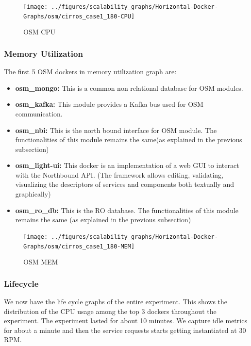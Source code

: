 \begin{figure}[h]
	\centering
	\texttt{[image: ../figures/scalability\_graphs/Horizontal-Docker-Graphs/osm/cirros\_case1\_180-CPU]}
	\caption{OSM CPU}
	\label{fig:cirroscase1180-cpu}
\end{figure}

\pagebreak



\subsubsection{Memory Utilization}

The first 5 OSM dockers in memory utilization graph are:

\begin{itemize}
	\item \textbf{osm\_mongo:} This is a common non relational database for OSM modules.
	\item \textbf{osm\_kafka:} This module provides a Kafka bus used for OSM communication.
	\item \textbf{osm\_nbi:} This is the north bound interface for OSM module. The functionalities of this module remains the same(as explained in the previous subsection)
	
	\item \textbf{osm\_light-ui:} This docker is an implementation of a web GUI to interact with the Northbound API. (The framework allows editing, validating, visualizing the descriptors of services and components both textually and graphically)
	\item \textbf{osm\_ro\_db:} This is the RO database. The functionalities of this module remains the same (as explained in the previous subsection)
	
\end{itemize}



\begin{figure}[h]
	\centering
	\texttt{[image: ../figures/scalability\_graphs/Horizontal-Docker-Graphs/osm/cirros\_case1\_180-MEM]}
	\caption{OSM MEM}
	\label{fig:cirroscase1180-mem}
\end{figure}


\subsubsection{Lifecycle}

We now have the life cycle graphs of the entire experiment. This shows the distribution of the CPU usage among the top 3 dockers throughout the experiment. The experiment lasted for about 10 minutes. We capture idle metrics for about a minute and then the service requests starts getting instantiated at 30 RPM.

